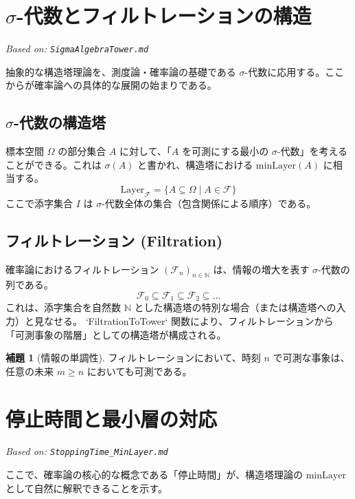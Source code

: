 \documentclass[a4paper,11pt]{ltjsarticle}
\theoremstyle{definition}
\newtheorem{lemma}[definition]{補題}
\newcommand{\N}{\mathbb{N}}
\newcommand{\OmegaSpace}{\Omega}
\newcommand{\F}{\mathcal{F}}
\newcommand{\Layer}[1]{\mathrm{Layer}_{#1}}
\newcommand{\MinLayer}{\mathrm{minLayer}}
\begin{document}
\section{$\sigma$-代数とフィルトレーションの構造}
\label{sec:sigma_algebra}
\textit{Based on: \texttt{SigmaAlgebraTower.md}}

抽象的な構造塔理論を、測度論・確率論の基礎である $\sigma$-代数に応用する。ここからが確率論への具体的な展開の始まりである。

\subsection{$\sigma$-代数の構造塔}
標本空間 $\OmegaSpace$ の部分集合 $A$ に対して、「$A$ を可測にする最小の $\sigma$-代数」を考えることができる。これは $\sigma(A)$ と書かれ、構造塔における $\MinLayer(A)$ に相当する。
\[ \Layer{\F} = \{A \subseteq \OmegaSpace \mid A \in \F\} \]
ここで添字集合 $I$ は $\sigma$-代数全体の集合（包含関係による順序）である。

\subsection{フィルトレーション (Filtration)}
確率論におけるフィルトレーション $(\F_n)_{n \in \N}$ は、情報の増大を表す $\sigma$-代数の列である。
\[ \F_0 \subseteq \F_1 \subseteq \F_2 \subseteq \dots \]
これは、添字集合を自然数 $\N$ とした構造塔の特別な場合（または構造塔への入力）と見なせる。
`FiltrationToTower` 関数により、フィルトレーションから「可測事象の階層」としての構造塔が構成される。

\begin{lemma}[情報の単調性]
フィルトレーションにおいて、時刻 $n$ で可測な事象は、任意の未来 $m \ge n$ においても可測である。
\end{lemma}

\section{停止時間と最小層の対応}
\label{sec:stopping_time}
\textit{Based on: \texttt{StoppingTime\_MinLayer.md}}

ここで、確率論の核心的な概念である「停止時間」が、構造塔理論の $\MinLayer$ として自然に解釈できることを示す。
\end{document}
